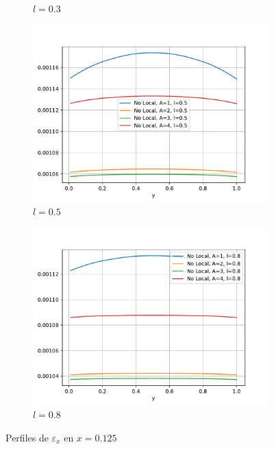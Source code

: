 \begin{figure}
\begin{subfigure}{0.48\textwidth}
		        \caption{$l=0.3$}
		        \label{fig:perfilesbarraX0125.03}
		    \end{subfigure}
		    \quad
		    \begin{subfigure}{0.48\textwidth}
		    \centering
		        \includegraphics[width=\textwidth]{figuras/Barra/Perfiles/X/X0.5_0.125.pdf}
		        \caption{$l=0.5$}
		        \label{fig:perfilesbarraX0125.05}
		    \end{subfigure}
		    \begin{subfigure}{0.48\textwidth}
		    \centering
		        \includegraphics[width=\textwidth]{figuras/Barra/Perfiles/X/X0.8_0.125.pdf}
		        \caption{$l=0.8$}
		        \label{fig:perfilesbarraX0125.08}
		    \end{subfigure}
		    \caption{Perfiles de $\varepsilon_x$ en $x=0.125$}
		    \label{fig:perfilesbarraX0125}
		\end{figure}


